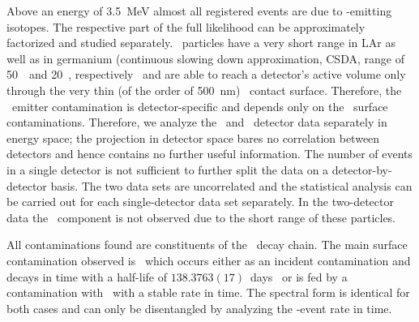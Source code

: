 Above an energy of 3.5~MeV almost all registered events are due to \a-emitting isotopes.
The respective part of the full likelihood can be approximately factorized and studied
separately.  \a\ particles have a very short range in LAr as well as in germanium
(continuous slowing down approximation, CSDA, range of 50~\mum\ and 20~\mum,
respectively~\cite{Berger2017} and are able to reach a detector's active volume only
through the very thin (of the order of 500~nm) \pplus\ contact surface. Therefore, the \a\
emitter contamination is detector-specific and depends only on the \pplus\ surface
contaminations. Therefore, we analyze the \enrBEGeII\ and \enrCoaxII\ detector data
separately in energy space; the projection in detector space bares no correlation between
detectors and hence contains no further useful information. The number of events in a
single detector is not sufficient to further split the data on a detector-by-detector
basis. The two data sets are uncorrelated and the statistical analysis can be carried out
for each single-detector data set separately. In the two-detector data the \a\ component
is not observed due to the short range of these particles.

All contaminations found are constituents of the \Uh\ decay chain. The main surface
contamination observed is \Po\ which occurs either as an incident contamination and decays
in time with a half-life of $138.3763(17)$~days~\cite{Be2008} or is fed by a contamination
with \Pbl\ with a stable rate in time. The spectral form is identical for both cases and
can only be disentangled by analyzing the \a-event rate in time.


